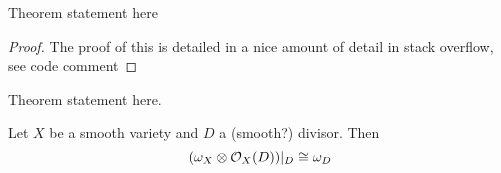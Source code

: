 %

\begin{theorem}
  \label{thm:alt_desc_conormal}
  Theorem statement here
\end{theorem}

\begin{proof}
  The proof of this is detailed in a nice amount of detail in
  stack overflow, see code comment
\end{proof}

%
%


\begin{theorem}
  \label{thm:det_exact_sequence_tensor}
  Theorem statement here.

\end{theorem}




\begin{theorem}
	\label{thm:adjunction_formula}
	Let \(X\) be a smooth variety and \(D\) a
	(smooth?) divisor. 
	Then 
	\[
    (\omega_{X} \otimes \mathcal{O}_X( D))|_{D} 
    \cong \omega_{D}
	\] 
	
\end{theorem}

